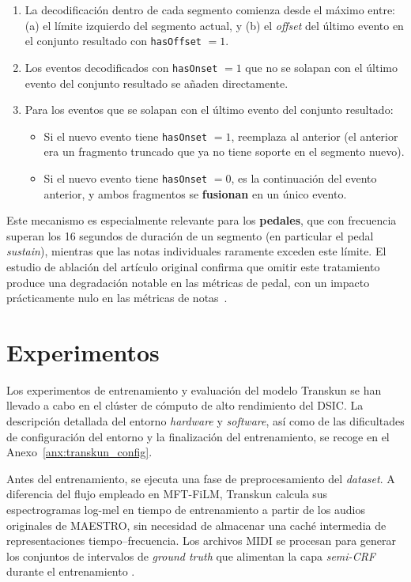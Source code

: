 \documentclass[11pt,spanish,listoffigures,listoftables]{tfgetsinf}
\begin{document}
\begin{enumerate}
  \item La decodificación dentro de cada segmento comienza desde el máximo entre:
  (a) el límite izquierdo del segmento actual, y (b) el \textit{offset} del último evento
  en el conjunto resultado con \texttt{hasOffset} $= 1$.

  \item Los eventos decodificados con \texttt{hasOnset} $= 1$ que no se solapan
  con el último evento del conjunto resultado se añaden directamente.

  \item Para los eventos que se solapan con el último evento del conjunto resultado:
  \begin{itemize}
    \item Si el nuevo evento tiene \texttt{hasOnset} $= 1$, reemplaza al anterior
    (el anterior era un fragmento truncado que ya no tiene soporte en el segmento
    nuevo).
    \item Si el nuevo evento tiene \texttt{hasOnset} $= 0$, es la continuación
    del evento anterior, y ambos fragmentos se \textbf{fusionan} en un único
    evento.
  \end{itemize}
\end{enumerate}

Este mecanismo es especialmente relevante para los \textbf{pedales}, que con
frecuencia superan los 16 segundos de duración de un segmento (en particular el
pedal \textit{sustain}), mientras que las notas individuales raramente exceden
este límite. El estudio de ablación del artículo original confirma que omitir este
tratamiento produce una degradación notable en las métricas de pedal, con un
impacto prácticamente nulo en las métricas de notas~\cite{yan2024transkun}.


\section{Experimentos}
\label{sec:transkunexpresultados}

Los experimentos de entrenamiento y evaluación del modelo Transkun se han llevado a cabo en el clúster de cómputo de alto rendimiento del DSIC.
La descripción detallada del entorno \textit{hardware} y \textit{software}, así como de las dificultades de configuración del entorno y la
finalización del entrenamiento, se recoge en el Anexo~\ref{anx:transkun_config}.

Antes del entrenamiento, se ejecuta una fase de preprocesamiento del \textit{dataset}. A diferencia del flujo empleado
en MFT-FiLM, Transkun calcula sus espectrogramas log-mel en tiempo de entrenamiento a partir de los audios originales de
MAESTRO, sin necesidad de almacenar una caché intermedia de representaciones tiempo--frecuencia. Los archivos MIDI se procesan para generar los conjuntos de intervalos de \textit{ground truth} que alimentan la capa \textit{semi-CRF} durante el entrenamiento \cite{yan2024transkun}.
\end{document}
